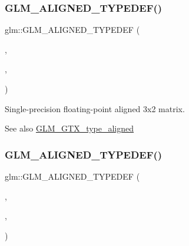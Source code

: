 \subsubsection{\texorpdfstring{G\+L\+M\+\_\+\+A\+L\+I\+G\+N\+E\+D\+\_\+\+T\+Y\+P\+E\+D\+E\+F()}{GLM\_ALIGNED\_TYPEDEF()}\hspace{0.1cm}{\footnotesize\ttfamily [187/209]}}
{\footnotesize\ttfamily glm\+::\+G\+L\+M\+\_\+\+A\+L\+I\+G\+N\+E\+D\+\_\+\+T\+Y\+P\+E\+D\+EF (\begin{DoxyParamCaption}\item[{\hyperlink{group__gtc__type__precision_ga61653615c76194cdf3454e6e703525e0}{f32mat3x2}}]{,  }\item[{aligned\+\_\+f32mat3x2}]{,  }\item[{16}]{ }\end{DoxyParamCaption})}

Single-\/precision floating-\/point aligned 3x2 matrix. \begin{DoxySeeAlso}{See also}
\hyperlink{group__gtx__type__aligned}{G\+L\+M\+\_\+\+G\+T\+X\+\_\+type\+\_\+aligned} 
\end{DoxySeeAlso}
\mbox{\label{group__gtx__type__aligned_ga3f510999e59e1b309113e1d561162b29}} 
\subsubsection{\texorpdfstring{G\+L\+M\+\_\+\+A\+L\+I\+G\+N\+E\+D\+\_\+\+T\+Y\+P\+E\+D\+E\+F()}{GLM\_ALIGNED\_TYPEDEF()}\hspace{0.1cm}{\footnotesize\ttfamily [188/209]}}
{\footnotesize\ttfamily glm\+::\+G\+L\+M\+\_\+\+A\+L\+I\+G\+N\+E\+D\+\_\+\+T\+Y\+P\+E\+D\+EF (\begin{DoxyParamCaption}\item[{\hyperlink{group__gtc__type__precision_ga715b36ea1e2d1ffaaef7517cc78b3877}{f32mat3x3}}]{,  }\item[{aligned\+\_\+f32mat3x3}]{,  }\item[{16}]{ }\end{DoxyParamCaption})}

